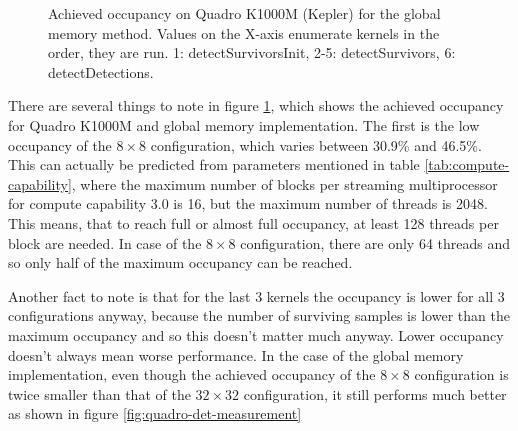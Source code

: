 \begin{figure}[ht]
\centering{}
	\caption{Achieved occupancy on Quadro K1000M (Kepler) for the global memory method. Values on the X-axis enumerate kernels in the order, they are run. 1: detectSurvivorsInit, 2-5: detectSurvivors, 6: detectDetections.}
	\label{fig:occupancy-quadro}
\end{figure}

There are several things to note in figure \ref{fig:occupancy-quadro}, which shows the achieved occupancy for Quadro K1000M and global memory implementation. The first is the low occupancy of the $8 \times 8$ configuration, which varies between 30.9\% and 46.5\%. This can actually be predicted from parameters mentioned in table \ref{tab:compute-capability}, where the maximum number of blocks per streaming multiprocessor for compute capability 3.0 is 16, but the maximum number of threads is 2048. This means, that to reach full or almost full occupancy, at least 128 threads per block are needed. In case of the $8 \times 8$ configuration, there are only 64 threads and so only half of the maximum occupancy can be reached.

Another fact to note is that for the last 3 kernels the occupancy is lower for all 3 configurations anyway, because the number of surviving samples is lower than the maximum occupancy and so this doesn't matter much anyway. Lower occupancy doesn't always mean worse performance. In the case of the global memory implementation, even though the achieved occupancy of the $8 \times 8$ configuration is twice smaller than that of the $32 \times 32$ configuration, it still performs much better as shown in figure \ref{fig:quadro-det-measurement}

